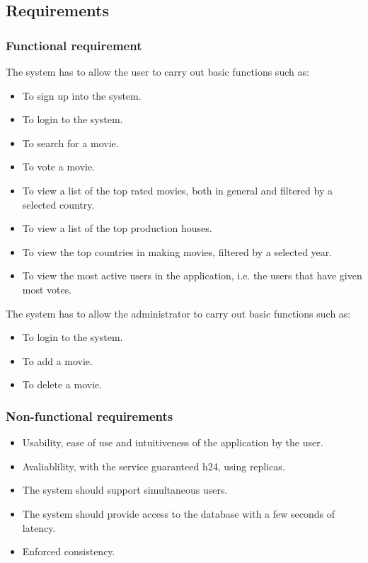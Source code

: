 \documentclass[a4paper, oneside]{article}
\begin{document}
\subsection{Requirements}

\subsubsection{Functional requirement}
The system has to allow the user to carry out basic functions such as:
\begin{itemize}
\item To sign up into the system.
\item To login to the system.
\item To search for a movie.
\item To vote a movie.
\item To view a list of the top rated movies, both in general and filtered by a selected country.
\item To view a list of the top production houses.
\item To view the top countries in making movies, filtered by a selected year.
\item To view the most active users in the application, i.e. the users that have given most votes.
\end{itemize}
\vspace{2mm}
The system has to allow the administrator to carry out basic functions such as:
\begin{itemize}
\item To login to the system.
\item To add a movie.
\item To delete a movie.
\end{itemize}
\vspace{2mm}

\subsubsection{Non-functional requirements}
\begin{itemize}
\item Usability, ease of use and intuitiveness of the application by the user.
\item Avaliablility, with the service guaranteed h24, using replicas.
\item The system should support simultaneous users.
\item The system should provide access to the database with a few seconds of latency.
\item Enforced consistency.
\end{itemize}
\end{document}
